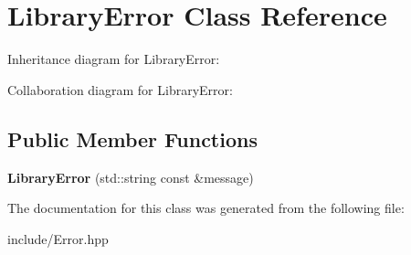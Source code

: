 \hypertarget{class_library_error}{}\section{Library\+Error Class Reference}
\label{class_library_error}


Inheritance diagram for Library\+Error\+:


Collaboration diagram for Library\+Error\+:
\subsection*{Public Member Functions}
\begin{DoxyCompactItemize}
\item 
\mbox{\label{class_library_error_af764d847bfe33e781fa39ed348e6f46f}} 
{\bfseries Library\+Error} (std\+::string const \&message)
\end{DoxyCompactItemize}


The documentation for this class was generated from the following file\+:\begin{DoxyCompactItemize}
\item 
include/Error.\+hpp\end{DoxyCompactItemize}
